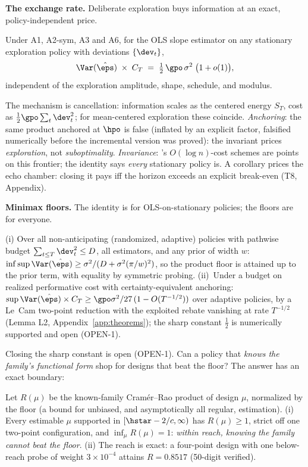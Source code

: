 \documentclass{article}
\begin{document}
\textbf{The exchange rate.} Deliberate exploration buys information at an exact, policy-independent price.

\begin{theorem}
\label{thm:exchange}
Under A1, A2-sym, A3 and A6, for the OLS slope estimator on any stationary exploration policy with deviations $\{\dev_t\}$,
\[
\Var(\hat\eps)\;\times\;C_T \;=\; \tfrac{1}{2}\,\gpo\,\sigma^2\;\big(1 + o(1)\big),
\]
independent of the exploration amplitude, shape, schedule, and modulus.
\end{theorem}

The mechanism is cancellation: information scales as the centered energy $S_T$, cost as $\tfrac{1}{2}\gpo\sum_t \dev_t^2$; for mean-centered exploration these coincide. \emph{Anchoring}: the same product anchored at $\hpo$ is false (inflated by an explicit factor, falsified numerically before the incremental version was proved): the invariant prices \emph{exploration}, not \emph{suboptimality}. \emph{Invariance}: \citet{lai1979adaptive}'s $O(\log n)$-cost schemes are points on this frontier; the identity says \emph{every} stationary policy is. A corollary prices the echo chamber: closing it pays iff the horizon exceeds an explicit break-even (T8, Appendix).

\textbf{Minimax floors.} The identity is for OLS-on-stationary policies; the floors are for everyone.

\begin{theorem}
\label{thm:devbudget}
(i) Over all non-anticipating (randomized, adaptive) policies with pathwise budget $\sum_{t\le T}\dev_t^2 \le D$, all estimators, and any prior of width $w$: $\inf\sup\Var(\hat\eps) \ge \sigma^2/(D + \sigma^2(\pi/w)^2)$, so the product floor is attained up to the prior term, with equality by symmetric probing. (ii)~Under a budget on realized performative cost with certainty-equivalent anchoring: $\sup \Var(\hat\eps)\times C_T \ge \gpo\sigma^2/27\,(1-O(T^{-1/2}))$ over adaptive policies, by a Le~Cam two-point reduction with the exploited rebate vanishing at rate $T^{-1/2}$ (Lemma L2, Appendix~\ref{app:theorems}); the sharp constant $\tfrac{1}{2}$ is numerically supported and open (OPEN-1).
\end{theorem}

Closing the sharp constant is open (OPEN-1). Can a policy that \emph{knows the family's functional form} shop for designs that beat the floor? The answer has an exact boundary:

\begin{theorem}
\label{thm:reach}
Let $R(\mu)$ be the known-family Cram\'er--Rao product of design $\mu$, normalized by the floor (a bound for unbiased, and asymptotically all regular, estimation). (i) Every estimable $\mu$ supported in $[\hstar - 2/c, \infty)$ has $R(\mu) \ge 1$, strict off one two-point configuration, and $\inf_\mu R(\mu) = 1$: \emph{within reach, knowing the family cannot beat the floor}. (ii) The reach is exact: a four-point design with one below-reach probe of weight $3{\times}10^{-4}$ attains $R = 0.8517$ (50-digit verified).
\end{theorem}
\end{document}
